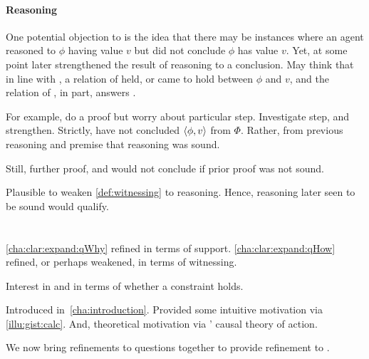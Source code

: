 \paragraph{Reasoning}

\begin{note}
  One potential objection to \qWhyV{} is the idea that there may be instances where an agent reasoned to \(\phi\) having value \(v\) but did not conclude \(\phi\) has value \(v\).
  Yet, at some point later strengthened the result of reasoning to a conclusion.
  May think that in line with \supportII{}, a relation of \support{} held, or came to hold between \(\phi\) and \(v\), and the relation of \support{}, in part, answers \qWhyV{}.

  For example, do a proof but worry about particular step.
  Investigate step, and strengthen.
  Strictly, have not concluded \(\langle \phi, v \rangle\) from \(\Phi\).
  Rather, from previous reasoning and premise that reasoning was sound.

  Still, further proof, and would not conclude if prior proof was not sound.

  Plausible to weaken \autoref{def:witnessing} to reasoning.
  Hence, reasoning later seen to be sound would qualify.
\end{note}

\section{\issueInclusion{}}
\label{cha:clar:expand:issue}

\begin{note}
  \autoref{cha:clar:expand:qWhy} refined \qWhy{} in terms of support.
  \autoref{cha:clar:expand:qHow} refined, or perhaps weakened, \qHow{} in terms of witnessing.

  Interest in \qWhy{} and \qHow{} in terms of whether a constraint holds.

  \begin{quote}
    \vspace{-\baselineskip}
    \issueInclusionFirst*
  \end{quote}

  Introduced in~\autoref{cha:introduction}.
  Provided some intuitive motivation via \autoref{illu:gist:calc}.
  And, theoretical motivation via \citeauthor{Davidson:1963aa}' causal theory of action.

  We now bring refinements to questions together to provide refinement to \issueInclusion{}.
\end{note}

